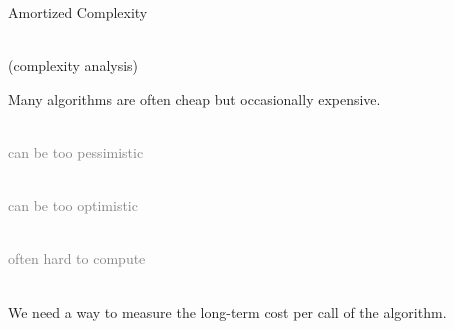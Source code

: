 \documentclass[mathserif, handout]{beamer}
\begin{document}
\begin{frame}{Amortized Complexity}
\begin{center}
\Large {} \\[1mm]
\normalsize\color{gray} (complexity analysis)
\end{center}
\end{frame}

\begin{frame}
Many algorithms are often cheap but occasionally expensive.
\\[8mm]
\begin{minipage}{0.33\textwidth}
\centering
{} \\[2mm]
\footnotesize\textcolor{gray}{can be too pessimistic}
\end{minipage}%
\begin{minipage}{0.33\textwidth}
\centering
{} \\[2mm]
\footnotesize\textcolor{gray}{can be too optimistic}
\end{minipage}%
\begin{minipage}{0.33\textwidth}
\centering
{} \\[2mm]
\footnotesize\textcolor{gray}{often hard to compute}
\end{minipage}
\\[8mm]
We need a way to measure the long-term cost per call of the algorithm.
\end{frame}
\end{document}
